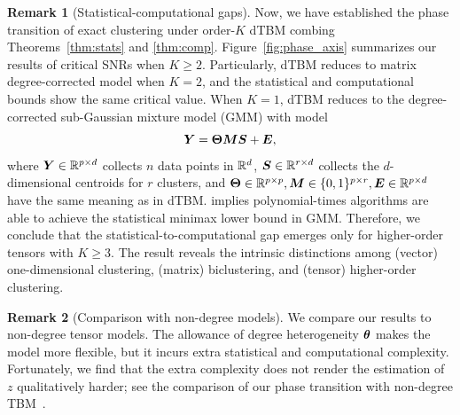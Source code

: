 \documentclass[lettersize,journal]{IEEEtran}
\theoremstyle{definition}
\theoremstyle{definition}
\newtheorem{rmk}{Remark}
\def\fixme#1#2{\textbf{\color{red}[FIXME (#1): #2]}}
\begin{document}
\begin{rmk}[Statistical-computational gaps]
Now, we have established the phase transition of exact clustering under order-$K$ dTBM combing Theorems~\ref{thm:stats} and \ref{thm:comp}. Figure~\ref{fig:phase_axis} summarizes our results of critical SNRs when $K \geq 2$. Particularly, dTBM reduces to matrix degree-corrected model when $K =2$, and the statistical and computational bounds show the same critical value. When $K =1$, dTBM reduces to the degree-corrected sub-Gaussian mixture model (GMM) with model
\begin{equation}
    \bm Y = \boldsymbol{\Theta} \bm M \bm S + \bm{E},
\end{equation}
where $\bm Y \in \mathbb{R}^{p \times d}$ collects $n$ data points in $\mathbb{R}^d$, $\bm S \in \mathbb{R}^{r \times d}$ collects the $d$-dimensional centroids for $r$ clusters, and $\boldsymbol{\Theta} \in \mathbb{R}^{p \times p}, \bm M \in \{0,1\}^{p \times r}, \bm{E} \in \mathbb{R}^{p \times d}$ have the same meaning as in dTBM. \cite{lu2016statistical} implies polynomial-times algorithms are able to achieve the statistical minimax lower bound in GMM. Therefore, we conclude that the statistical-to-computational gap emerges only for higher-order tensors with $K \geq 3$. The result reveals the intrinsic distinctions among (vector) one-dimensional clustering, (matrix) biclustering, and (tensor) higher-order clustering. 
\end{rmk}


\begin{rmk}[Comparison with non-degree models]
We compare our results to non-degree tensor models. 
The allowance of degree heterogeneity $\boldsymbol{\theta}$ makes the model more flexible, but it incurs extra statistical and computational complexity. Fortunately, we find that the extra complexity does not render the estimation of $z$ qualitatively harder; see the comparison of our phase transition with non-degree TBM~\citep{han2020exact}. 
\end{rmk}
\end{document}
